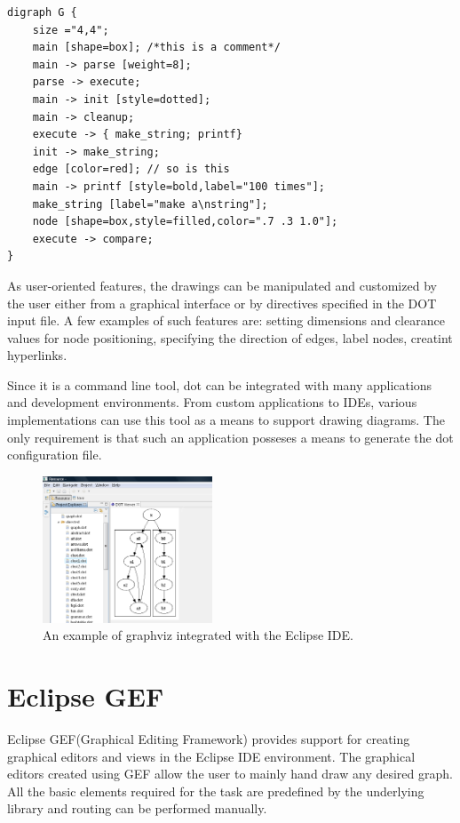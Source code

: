 \begin{lstlisting}[caption={Customized graph dot file representation}]
digraph G {
	size ="4,4";
	main [shape=box]; /*this is a comment*/
	main -> parse [weight=8];
	parse -> execute;
	main -> init [style=dotted];
	main -> cleanup;
	execute -> { make_string; printf}
	init -> make_string;
	edge [color=red]; // so is this
	main -> printf [style=bold,label="100 times"];
	make_string [label="make a\nstring"];
	node [shape=box,style=filled,color=".7 .3 1.0"];
	execute -> compare;
}
\end{lstlisting}

As user-oriented features, the drawings can be manipulated and customized by the user either from a graphical 
interface or by directives specified in the DOT input file. A few examples of such features are: setting dimensions 
and clearance values for node positioning, specifying the direction of edges, label nodes, creatint hyperlinks.

Since it is a command line tool, dot can be integrated with many applications and development environments. From 
custom applications to IDEs, various implementations can use this tool as a means to support drawing diagrams. The 
only requirement is that such an application posseses a means to generate the dot configuration file.

\begin{figure}[ht] \centering
\includegraphics[width=0.45\textwidth]{img/relatedwork/graphviz.png}
\caption{An example of graphviz integrated with the Eclipse IDE.\protect\footnotemark} \end{figure}

\section{Eclipse GEF}

Eclipse GEF(Graphical Editing Framework) provides support for creating graphical editors and views in the Eclipse IDE environment. The graphical 
editors created using GEF allow the user to mainly hand draw any desired graph. All the basic elements required for the task are predefined 
by the underlying library and routing can be performed manually.


